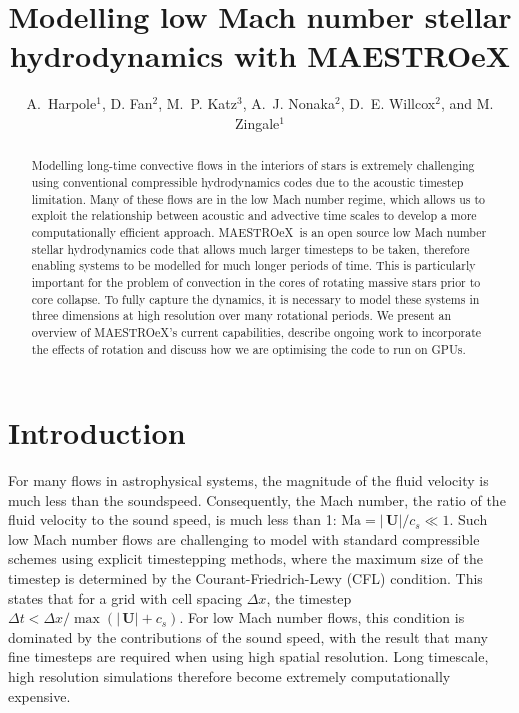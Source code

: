 \documentclass[a4paper]{jpconf}
\newcommand{\maestroex}{{\sffamily MAESTROeX}}
\newcommand{\Ub}{{\,\bm{U}}}
\begin{document}
\title{Modelling low Mach number stellar hydrodynamics with MAESTROeX}

\author{A.~Harpole$^1$,
        D. Fan$^2$,
        M.~P. Katz$^3$,
        A.~J. Nonaka$^2$,
        D.~E. Willcox$^2$, and
        M. Zingale$^1$}

\address{$^1$Department of Physics and Astronomy, Stony Brook
  University, Stony Brook, NY 11794-3800 USA}

\address{$^2$Center for Computational Sciences and Engineering,
  Lawrence Berkeley National Lab, Berkeley, CA 94720 USA}

\address{$^3$NVIDIA Corporation, 2788 San Tomas Expressway,
  Santa Clara, CA, 95050 USA}



\begin{abstract}
Modelling long-time convective flows in the interiors of stars is extremely challenging using conventional compressible hydrodynamics codes due to the acoustic timestep limitation.
Many of these flows are in the low Mach number regime, which allows us to exploit the relationship between acoustic and advective time scales to develop a more computationally efficient approach.
\maestroex\ is an open source low Mach number stellar hydrodynamics code that allows much larger timesteps to be taken, therefore enabling systems to be modelled for much longer periods of time. This is particularly important for the problem of convection in the cores of rotating massive stars prior to core collapse. To fully capture the dynamics, it is necessary to model these systems in three dimensions at high resolution over many rotational periods.  We present an overview of \maestroex's current capabilities, describe ongoing work to incorporate the effects of rotation and discuss how we are optimising the code to run on GPUs. 
\end{abstract}


\section{Introduction} \label{sec:intro}

For many flows in astrophysical systems, the magnitude of the fluid velocity is much less than the soundspeed. Consequently, the Mach number, the ratio of the fluid velocity to the sound speed, is much less than 1: $\textrm{Ma} = |\Ub| / c_s \ll 1$. Such low Mach number flows are challenging to model with standard compressible schemes using explicit timestepping methods, where the maximum size of the timestep is determined by the Courant-Friedrich-Lewy (CFL) condition. This states that for a grid with cell spacing $\Delta x$, the timestep $\Delta t <  \Delta x / \max(|\Ub|+c_s)$. For low Mach number flows, this condition is dominated by the contributions of the sound speed, with the result that many fine timesteps are required when using high spatial resolution. Long timescale, high resolution simulations therefore become extremely computationally expensive. 
\end{document}

